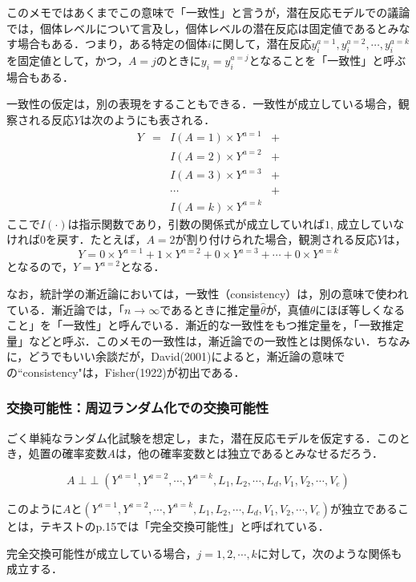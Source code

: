 \documentclass[12pt]{jsarticle}
\newcommand{\indep}{\mathop{\perp\!\!\!\perp}}
\begin{document}
このメモではあくまでこの意味で「一致性」と言うが，潜在反応モデルでの議論では，個体レベルについて言及し，個体レベルの潜在反応は固定値であるとみなす場合もある．つまり，ある特定の個体$i$に関して，潜在反応$y_{i}^{a=1}, y_{i}^{a=2}, \cdots, y_{i}^{a=k}$を固定値として，かつ，$A=j$のときに$y_{i} = y_{i}^{a=j}$となることを「一致性」と呼ぶ場合もある．

一致性の仮定は，別の表現をすることもできる．一致性が成立している場合，観察される反応$Y$は次のようにも表される．
\[
\begin{array}{llcl}
Y & = & I(A=1) \times Y^{a=1}  & + \\
   &    & I(A=2) \times Y^{a=2} & +  \\
   &    & I(A=3) \times Y^{a=3}  & + \\
   &    & \cdots & + \\
   &   &I(A=k) \times Y^{a=k}  & 
\end{array}
\]
ここで$I(\cdot)$は指示関数であり，引数の関係式が成立していれば$1$, 成立していなければ$0$を戻す．たとえば，$A=2$が割り付けられた場合，観測される反応$Y$は，
\[
Y = 0 \times Y^{a=1} +1 \times Y^{a=2}+ 0 \times Y^{a=3} + \cdots + 0 \times Y^{a=k} 
\]
となるので，$Y = Y^{a=2}$となる．


なお，統計学の漸近論においては，一致性（consistency）は，別の意味で使われている．漸近論では，「$n \rightarrow \infty$であるときに推定量$\widehat{\theta}$が，真値$\theta$にほぼ等しくなること」を「一致性」と呼んでいる．漸近的な一致性をもつ推定量を，「一致推定量」などと呼ぶ．このメモの一致性は，漸近論での一致性とは関係ない．ちなみに，どうでもいい余談だが，David(2001)によると，漸近論の意味での``consistency"は，Fisher(1922)が初出である．


\subsubsection{交換可能性：周辺ランダム化での交換可能性}
ごく単純なランダム化試験を想定し，また，潜在反応モデルを仮定する．このとき，処置の確率変数$A$は，他の確率変数とは独立であるとみなせるだろう．

\[
A \indep (Y^{a=1}, Y^{a=2}, \cdots, Y^{a=k}, L_1, L_2, \cdots, L_d, V_1, V_2, \cdots, V_e)
\]

このように$A$と$(Y^{a=1}, Y^{a=2}, \cdots, Y^{a=k},L_1, L_2, \cdots, L_d, V_1, V_2, \cdots, V_e)$が独立であることは，テキストのp.15では「完全交換可能性」と呼ばれている．

完全交換可能性が成立している場合，$j=1,2,\cdots,k$に対して，次のような関係も成立する．
\end{document}

